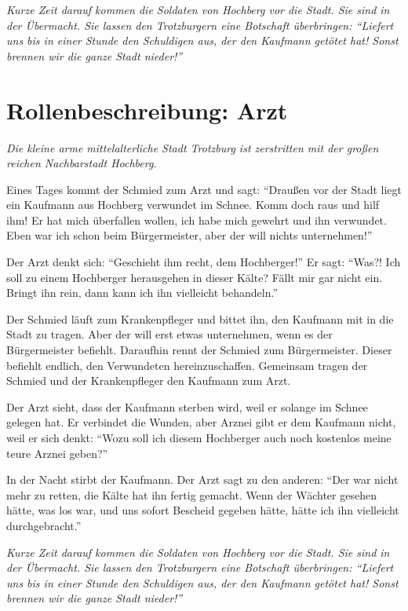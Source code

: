 \emph{Kurze Zeit darauf kommen die Soldaten von Hochberg vor die Stadt. Sie sind in der Übermacht. Sie lassen den Trotzburgern eine Botschaft überbringen: "`Liefert uns bis in einer Stunde den Schuldigen aus, der den Kaufmann getötet hat! Sonst brennen wir die ganze Stadt nieder!"'}
\newpage

\section*{Rollenbeschreibung: Arzt}

\emph{Die kleine arme mittelalterliche Stadt Trotzburg ist zerstritten mit der großen reichen Nachbarstadt Hochberg.}

Eines Tages kommt der Schmied zum Arzt und sagt: "`Draußen vor der Stadt liegt ein Kaufmann aus Hochberg verwundet im Schnee. Komm doch raus und hilf ihm! Er hat mich überfallen wollen, ich habe mich gewehrt und ihn verwundet. Eben war ich schon beim Bürgermeister, aber der will nichts unternehmen!"'

Der Arzt denkt sich: "`Geschieht ihm recht, dem Hochberger!"' Er sagt: "`Was?! Ich soll zu einem Hochberger herausgehen in dieser Kälte? Fällt mir gar nicht ein. Bringt ihn rein, dann kann ich ihn vielleicht behandeln."'

Der Schmied läuft zum Krankenpfleger und bittet ihn, den Kaufmann mit in die Stadt zu tragen. Aber der will erst etwas unternehmen, wenn es der Bürgermeister befiehlt. Daraufhin rennt der Schmied zum Bürgermeister. Dieser befiehlt endlich, den Verwundeten hereinzuschaffen. Gemeinsam tragen der Schmied und der Krankenpfleger den Kaufmann zum Arzt.

Der Arzt sieht, dass der Kaufmann sterben wird, weil er solange im Schnee gelegen hat. Er verbindet die Wunden, aber Arznei gibt er dem Kaufmann nicht, weil er sich denkt: "`Wozu soll ich diesem Hochberger auch noch kostenlos meine teure Arznei geben?"'

In der Nacht stirbt der Kaufmann. Der Arzt sagt zu den anderen: "`Der war nicht mehr zu retten, die Kälte hat ihn fertig gemacht. Wenn der Wächter gesehen hätte, was los war, und uns sofort Bescheid gegeben hätte, hätte ich ihn vielleicht durchgebracht."'

\emph{Kurze Zeit darauf kommen die Soldaten von Hochberg vor die Stadt. Sie sind in der Übermacht. Sie lassen den Trotzburgern eine Botschaft überbringen: "`Liefert uns bis in einer Stunde den Schuldigen aus, der den Kaufmann getötet hat! Sonst brennen wir die ganze Stadt nieder!"'}

